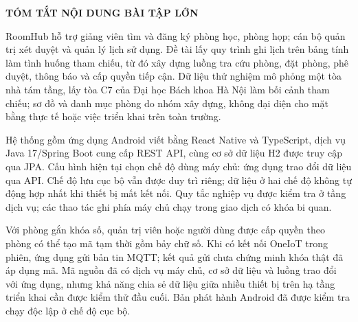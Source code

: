 \documentclass[../DoAn.tex]{subfiles}
\begin{document}
\begin{center}\bfseries\large TÓM TẮT NỘI DUNG BÀI TẬP LỚN\end{center}
\vspace{0.5cm}
RoomHub hỗ trợ giảng viên tìm và đăng ký phòng học, phòng họp; cán bộ quản trị xét duyệt và quản lý lịch sử dụng. Đề tài lấy quy trình ghi lịch trên bảng tính làm tình huống tham chiếu, từ đó xây dựng luồng tra cứu phòng, đặt phòng, phê duyệt, thông báo và cấp quyền tiếp cận. Dữ liệu thử nghiệm mô phỏng một tòa nhà tám tầng, lấy tòa C7 của Đại học Bách khoa Hà Nội làm bối cảnh tham chiếu; sơ đồ và danh mục phòng do nhóm xây dựng, không đại diện cho mặt bằng thực tế hoặc việc triển khai trên toàn trường.

Hệ thống gồm ứng dụng Android viết bằng React Native và TypeScript, dịch vụ Java 17/Spring Boot cung cấp REST API, cùng cơ sở dữ liệu H2 được truy cập qua JPA. Cấu hình hiện tại chọn chế độ dùng máy chủ: ứng dụng trao đổi dữ liệu qua API. Chế độ lưu cục bộ vẫn được duy trì riêng; dữ liệu ở hai chế độ không tự động hợp nhất khi thiết bị mất kết nối. Quy tắc nghiệp vụ được kiểm tra ở tầng dịch vụ; các thao tác ghi phía máy chủ chạy trong giao dịch có khóa bi quan.

Với phòng gắn khóa số, quản trị viên hoặc người dùng được cấp quyền theo phòng có thể tạo mã tạm thời gồm bảy chữ số. Khi có kết nối OneIoT trong phiên, ứng dụng gửi bản tin MQTT; kết quả gửi chưa chứng minh khóa thật đã áp dụng mã. Mã nguồn đã có dịch vụ máy chủ, cơ sở dữ liệu và luồng trao đổi với ứng dụng, nhưng khả năng chia sẻ dữ liệu giữa nhiều thiết bị trên hạ tầng triển khai cần được kiểm thử đầu cuối. Bản phát hành Android đã được kiểm tra chạy độc lập ở chế độ cục bộ.
\end{document}
